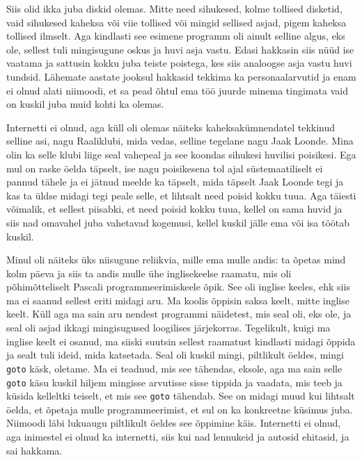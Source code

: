 
Siis olid ikka juba diskid olemas. Mitte need sihukesed, kolme tollised 
disketid, vaid sihukesed  kaheksa või viie tollised või mingid sellised asjad, 
pigem kaheksa tollised ilmselt. Aga kindlasti see esimene programm oli ainult 
selline algus, eks ole, sellest tuli mingisugune  oskus ja huvi asja vastu. 
Edasi hakkasin siis nüüd ise vaatama ja  sattusin kokku juba teiste poistega, 
kes siis analoogse asja vastu huvi tundsid. Lähemate aastate jooksul hakkasid 
tekkima ka personaalarvutid ja enam ei olnud alati niimoodi, et sa pead õhtul 
ema töö juurde minema tingimata vaid on kuskil juba muid kohti ka olemas.


Internetti ei olnud, aga küll oli olemas näiteks kaheksakümnendatel tekkinud 
selline asi, nagu Raaliklubi, mida vedas, selline tegelane 
nagu Jaak Loonde. Mina olin ka selle klubi liige seal 
vahepeal ja see koondas sihukesi huvilisi poisikesi. Ega mul on raske öelda 
täpselt,  ise nagu poisikesena tol ajal süstemaatiliselt ei pannud tähele ja ei 
jätnud meelde ka täpselt, mida täpselt Jaak Loonde tegi ja kas ta üldse midagi 
tegi peale selle, et lihtsalt need poisid kokku tuua. Aga täiesti võimalik, et 
sellest piisabki, et need poisid kokku tuua, kellel on sama huvid ja siis nad 
omavahel juba vahetavad kogemusi, kellel kuskil jälle ema või isa töötab 
kuskil. 

Minul oli näiteks üks niisugune reliikvia, mille ema mulle andis: ta õpetas 
mind kolm päeva ja siis ta andis mulle ühe inglisekeelse raamatu, mis oli 
põhimõtteliselt Pascali programmeerimiskeele õpik. See oli inglise keeles, ehk 
siis ma ei saanud sellest eriti midagi aru. Ma koolis õppisin saksa keelt, 
mitte inglise keelt. Küll aga ma sain aru 
nendest  programmi näidetest, mis seal oli, eks ole, ja seal oli asjad ikkagi 
mingisugused loogilises  järjekorras. Tegelikult, kuigi ma inglise keelt ei 
osanud, ma siiski suutsin sellest raamatust kindlasti midagi õppida ja sealt 
tuli ideid, mida katsetada. Seal oli kuskil mingi, piltlikult öeldes, mingi 
\verb|goto| käsk, oletame. Ma ei teadnud, mis see tähendas, eksole, aga ma sain 
selle \verb|goto| käsu kuskil hiljem mingisse arvutisse sisse tippida ja 
vaadata, mis teeb ja küsida kelleltki teiselt, et mis see \verb|goto| tähendab. 
See on midagi muud kui lihtsalt öelda, et õpetaja mulle programmeerimist, et 
sul on ka konkreetne küsimus juba. Niimoodi läbi lukuaugu piltlikult öeldes see 
õppimine käis. Internetti ei olnud, aga  inimestel ei olnud ka internetti, siis 
kui nad  lennukeid ja autosid ehitasid, ja sai hakkama.

